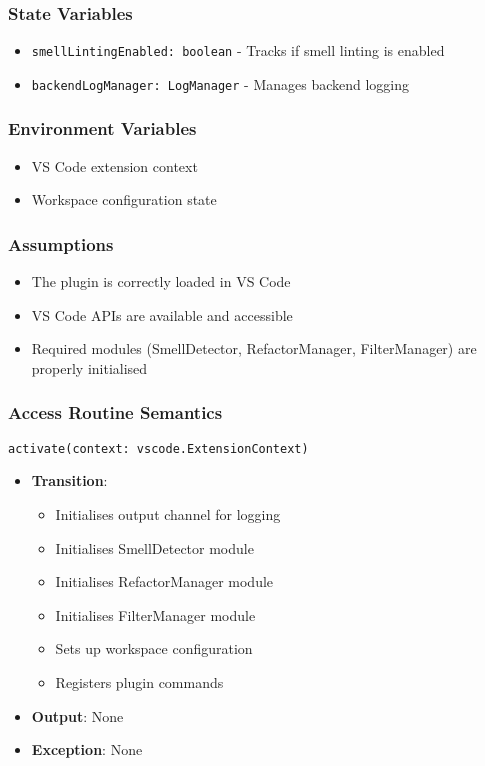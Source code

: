\documentclass[12pt, titlepage]{article}
\begin{document}
\subsubsection{State Variables}
\begin{itemize}
    \item \texttt{smellLintingEnabled: boolean} - Tracks if smell linting is enabled
    \item \texttt{backendLogManager: LogManager} - Manages backend logging
\end{itemize}

\subsubsection{Environment Variables}
\begin{itemize}
    \item VS Code extension context
    \item Workspace configuration state
\end{itemize}

\subsubsection{Assumptions}
\begin{itemize}
    \item The plugin is correctly loaded in VS Code
    \item VS Code APIs are available and accessible
    \item Required modules (SmellDetector, RefactorManager, FilterManager) are properly initialised
\end{itemize}

\subsubsection{Access Routine Semantics}

\noindent\texttt{activate(context: vscode.ExtensionContext)}
\begin{itemize}
    \item \textbf{Transition}: 
    \begin{itemize}
        \item Initialises output channel for logging
        \item Initialises SmellDetector module
        \item Initialises RefactorManager module
        \item Initialises FilterManager module
        \item Sets up workspace configuration
        \item Registers plugin commands
    \end{itemize}
    \item \textbf{Output}: None
    \item \textbf{Exception}: None
\end{itemize}
\end{document}
